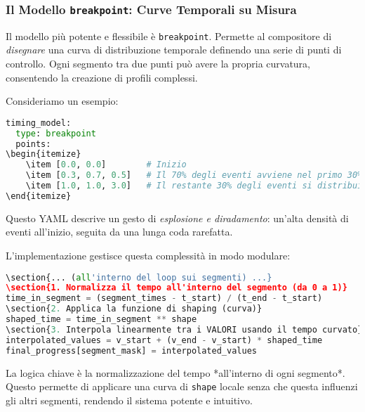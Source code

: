 \subsubsection{Il Modello \texttt{breakpoint}: Curve Temporali su Misura}
Il modello più potente e flessibile è \texttt{breakpoint}. Permette al compositore di \textit{disegnare} una curva di distribuzione temporale definendo una serie di punti di controllo. Ogni segmento tra due punti può avere la propria curvatura, consentendo la creazione di profili complessi.

Consideriamo un esempio:
\begin{lstlisting}[language=Python]
timing_model:
  type: breakpoint
  points:
\begin{itemize}
    \item [0.0, 0.0]        # Inizio
    \item [0.3, 0.7, 0.5]   # Il 70% degli eventi avviene nel primo 30% del tempo (curva concava, ease-out)
    \item [1.0, 1.0, 3.0]   # Il restante 30% degli eventi si distribuisce nel 70% del tempo rimanente (curva convessa, ease-in)
\end{itemize}
\end{lstlisting}
Questo YAML descrive un gesto di \textit{esplosione e diradamento}: un'alta densità di eventi all'inizio, seguita da una lunga coda rarefatta.

L'implementazione gestisce questa complessità in modo modulare:
\begin{lstlisting}[language=Python]
\section{... (all'interno del loop sui segmenti) ...}
\section{1. Normalizza il tempo all'interno del segmento (da 0 a 1)}
time_in_segment = (segment_times - t_start) / (t_end - t_start)
\section{2. Applica la funzione di shaping (curva)}
shaped_time = time_in_segment ** shape
\section{3. Interpola linearmente tra i VALORI usando il tempo curvato}
interpolated_values = v_start + (v_end - v_start) * shaped_time
final_progress[segment_mask] = interpolated_values
\end{lstlisting}
La logica chiave è la normalizzazione del tempo *all'interno di ogni segmento*. Questo permette di applicare una curva di \texttt{shape} locale senza che questa influenzi gli altri segmenti, rendendo il sistema potente e intuitivo.